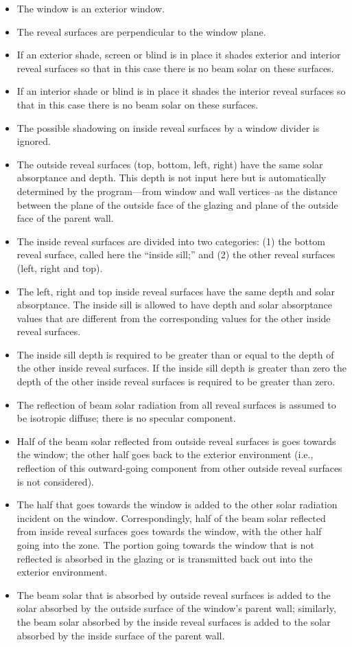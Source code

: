 \begin{itemize}
\item
  The window is an exterior window.
\item
  The reveal surfaces are perpendicular to the window plane.
\item
  If an exterior shade, screen or blind is in place it shades exterior and interior reveal surfaces so that in this case there is no beam solar on these surfaces.
\item
  If an interior shade or blind is in place it shades the interior reveal surfaces so that in this case there is no beam solar on these surfaces.
\item
  The possible shadowing on inside reveal surfaces by a window divider is ignored.
\item
  The outside reveal surfaces (top, bottom, left, right) have the same solar absorptance and depth. This depth is not input here but is automatically determined by the program---from window and wall vertices--as the distance between the plane of the outside face of the glazing and plane of the outside face of the parent wall.
\item
  The inside reveal surfaces are divided into two categories: (1) the bottom reveal surface, called here the ``inside sill;'' and (2) the other reveal surfaces (left, right and top).
\item
  The left, right and top inside reveal surfaces have the same depth and solar absorptance. The inside sill is allowed to have depth and solar absorptance values that are different from the corresponding values for the other inside reveal surfaces.
\item
  The inside sill depth is required to be greater than or equal to the depth of the other inside reveal surfaces. If the inside sill depth is greater than zero the depth of the other inside reveal surfaces is required to be greater than zero.
\item
  The reflection of beam solar radiation from all reveal surfaces is assumed to be isotropic diffuse; there is no specular component.
\item
  Half of the beam solar reflected from outside reveal surfaces is goes towards the window; the other half goes back to the exterior environment (i.e., reflection of this outward-going component from other outside reveal surfaces is not considered).
\item
  The half that goes towards the window is added to the other solar radiation incident on the window. Correspondingly, half of the beam solar reflected from inside reveal surfaces goes towards the window, with the other half going into the zone. The portion going towards the window that is not reflected is absorbed in the glazing or is transmitted back out into the exterior environment.
\item
  The beam solar that is absorbed by outside reveal surfaces is added to the solar absorbed by the outside surface of the window's parent wall; similarly, the beam solar absorbed by the inside reveal surfaces is added to the solar absorbed by the inside surface of the parent wall.
\end{itemize}


